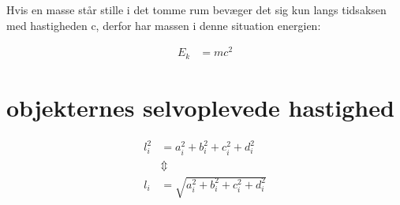 \documentclass[11pt,a4paper]{memoir}
\begin{document}
Hvis en masse står stille i det tomme rum bevæger det sig kun langs tidsaksen med hastigheden c, derfor har massen i denne situation energien:

\begin{equation}
\begin{aligned}
E_k &= mc^2
\end{aligned}
\end{equation}

\FloatBarrier
\section{objekternes selvoplevede hastighed}
\begin{equation}
\begin{aligned}
l_i^2&=a_i^2+b_i^2+c_i^2+d_i^2\\
&\Updownarrow \\
l_i&=\sqrt{a_i^2+b_i^2+c_i^2+d_i^2}
\end{aligned}
\end{equation}
\end{document}

